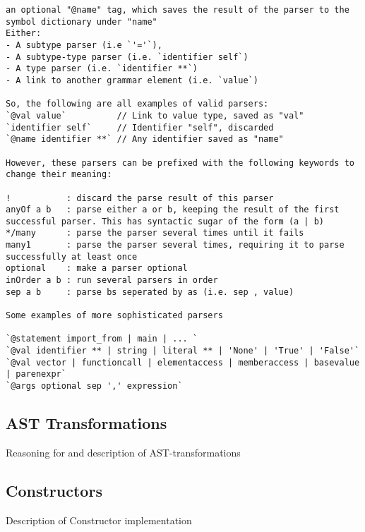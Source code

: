 \documentclass{article}
\begin{document}
\begin{lstlisting}
an optional "@name" tag, which saves the result of the parser to the symbol dictionary under "name"
Either:
- A subtype parser (i.e `'='`),
- A subtype-type parser (i.e. `identifier self`)
- A type parser (i.e. `identifier **`)
- A link to another grammar element (i.e. `value`)

So, the following are all examples of valid parsers:
`@val value`          // Link to value type, saved as "val"
`identifier self`     // Identifier "self", discarded
`@name identifier **` // Any identifier saved as "name"

However, these parsers can be prefixed with the following keywords to change their meaning:

!           : discard the parse result of this parser
anyOf a b   : parse either a or b, keeping the result of the first successful parser. This has syntactic sugar of the form (a | b)
*/many      : parse the parser several times until it fails
many1       : parse the parser several times, requiring it to parse successfully at least once
optional    : make a parser optional
inOrder a b : run several parsers in order
sep a b     : parse bs seperated by as (i.e. sep , value) 

Some examples of more sophisticated parsers

`@statement import_from | main | ... ` 
`@val identifier ** | string | literal ** | 'None' | 'True' | 'False'`
`@val vector | functioncall | elementaccess | memberaccess | basevalue | parenexpr`
`@args optional sep ',' expression`
\end{lstlisting}

\subsection{AST Transformations}

Reasoning for and description of AST-transformations

\subsection{Constructors}

Description of Constructor implementation

\newpage
\end{document}
